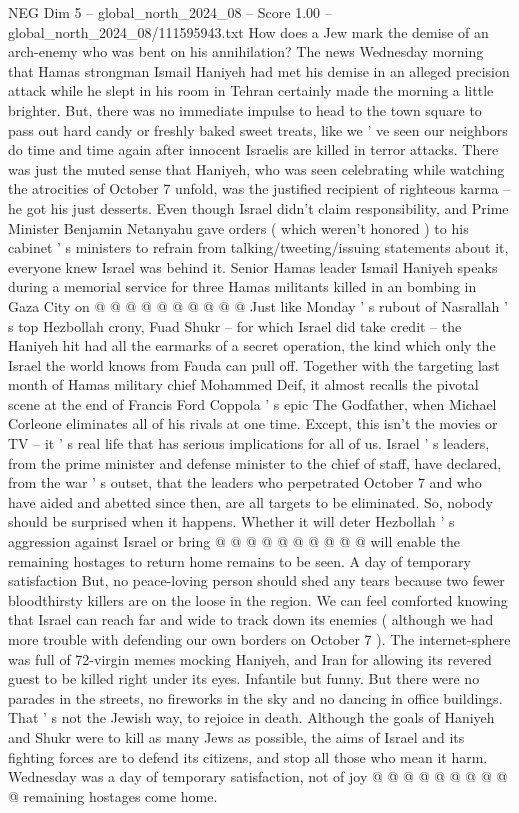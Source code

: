 \begin{textsample}{NEG Dim 5 – global\_north\_2024\_08 – Score 1.00 – global\_north\_2024\_08/111595943.txt}  \label{ex:f5_neg_078}
How does a Jew mark the demise of an arch-enemy who was bent on his annihilation?
The news Wednesday morning that Hamas strongman Ismail Haniyeh had met his demise in an alleged precision attack while he slept in his room in Tehran certainly made the morning a little brighter.
But, there was no immediate impulse to head to the town square to pass out hard candy or freshly baked sweet treats, like we ' ve seen our neighbors do time and time again after innocent Israelis are killed in terror attacks.
There was just the muted sense that Haniyeh, who was seen celebrating while watching the atrocities of October 7 unfold, was the justified recipient of righteous karma -- he got his just desserts.
Even though Israel didn't claim responsibility, and Prime Minister Benjamin Netanyahu gave orders ( which weren't honored ) to his cabinet ' s ministers to refrain from talking/tweeting/issuing statements about it, everyone knew Israel was behind it.
Senior Hamas leader Ismail Haniyeh speaks during a memorial service for three Hamas militants killed in an bombing in Gaza City on @ @ @ @ @ @ @ @ @ @ Just like Monday ' s rubout of Nasrallah ' s top Hezbollah crony, Fuad Shukr -- for which Israel did take credit -- the Haniyeh hit had all the earmarks of a secret operation, the kind which only the Israel the world knows from Fauda can pull off.
Together with the targeting last month of Hamas military chief Mohammed Deif, it almost recalls the pivotal scene at the end of Francis Ford Coppola ' s epic The Godfather, when Michael Corleone eliminates all of his rivals at one time.
Except, this isn't the movies or TV -- it ' s real life that has serious implications for all of us.
Israel ' s leaders, from the prime minister and defense minister to the chief of staff, have declared, from the war ' s outset, that the leaders who perpetrated October 7 and who have aided and abetted since then, are all targets to be eliminated.
So, nobody should be surprised when it happens.
Whether it will deter Hezbollah ' s aggression against Israel or bring @ @ @ @ @ @ @ @ @ @ will enable the remaining hostages to return home remains to be seen.
A day of temporary satisfaction But, no peace-loving person should shed any tears because two fewer bloodthirsty killers are on the loose in the region.
We can feel comforted knowing that Israel can reach far and wide to track down its enemies ( although we had more trouble with defending our own borders on October 7 ).
The internet-sphere was full of 72-virgin memes mocking Haniyeh, and Iran for allowing its revered guest to be killed right under its eyes.
Infantile but funny.
But there were no parades in the streets, no fireworks in the sky and no dancing in office buildings.
That ' s not the Jewish way, to rejoice in death.
Although the goals of Haniyeh and Shukr were to kill as many Jews as possible, the aims of Israel and its fighting forces are to defend its citizens, and stop all those who mean it harm.
Wednesday was a day of temporary satisfaction, not of joy @ @ @ @ @ @ @ @ @ @ remaining hostages come home.

\end{textsample}

